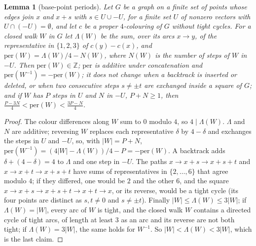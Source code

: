 \documentclass[11pt,a4paper]{amsart}
\newtheorem{lemma}{Lemma}
\theoremstyle{remark}
\newcommand{\Z}{\mathbb{Z}}
\begin{document}
\begin{lemma}[base-point periods]\label{lem:periods}
Let $G$ be a graph on a finite set of points whose edges join $x$ and $x+s$ with $s\in U\cup-U$, for a finite set $U$
of nonzero vectors with $U\cap(-U)=\emptyset$, and let $c$ be a proper $4$-colouring of $G$ without tight cycles. For a closed walk $W$ in $G$ let
$\Lambda(W)$ be the sum, over its arcs $x\to y$, of the representative in $\{1,2,3\}$ of $c(y)-c(x)$, and
$\mathrm{per}(W)=\Lambda(W)/4-N(W)$, where $N(W)$ is the number of steps of $W$ in $-U$. Then $\mathrm{per}(W)\in\Z$;
$\mathrm{per}$ is additive under concatenation and $\mathrm{per}(W^{-1})=-\mathrm{per}(W)$; it does not change when a
backtrack is inserted or deleted, or when two consecutive steps $s\ne\pm t$ are exchanged inside a square of $G$; and if
$W$ has $P$ steps in $U$ and $N$ in $-U$, $P+N\ge1$, then $\frac{P-3N}4<\mathrm{per}(W)<\frac{3P-N}4$.
\end{lemma}

\begin{proof}
The colour differences along $W$ sum to $0$ modulo $4$, so $4\mid\Lambda(W)$. $\Lambda$ and $N$ are additive; reversing
$W$ replaces each representative $\delta$ by $4-\delta$ and exchanges the steps in $U$ and $-U$, so, with $|W|=P+N$,
$\mathrm{per}(W^{-1})=(4|W|-\Lambda(W))/4-P=-\mathrm{per}(W)$. A backtrack adds $\delta+(4-\delta)=4$ to $\Lambda$ and one
step in $-U$. The paths $x\to x+s\to x+s+t$ and $x\to x+t\to x+s+t$ have sums of representatives in $\{2,\dots,6\}$
that agree modulo $4$; if they differed, one would be $2$ and the other $6$, and the square
$x\to x+s\to x+s+t\to x+t\to x$, or its reverse, would be a tight cycle (its four points are distinct as $s,t\ne0$ and
$s\ne\pm t$). Finally $|W|\le\Lambda(W)\le3|W|$; if $\Lambda(W)=|W|$, every arc of $W$ is tight, and the closed walk $W$
contains a directed cycle of tight arcs, of length at least $3$ as an arc and its reverse are not both tight; if
$\Lambda(W)=3|W|$, the same holds for $W^{-1}$. So $|W|<\Lambda(W)<3|W|$, which is the last claim.
\end{proof}
\end{document}
